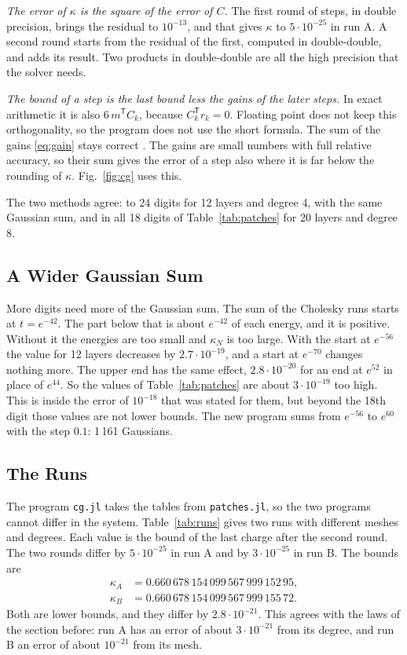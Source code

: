 \documentclass[journal]{IEEEtran}
\newcommand{\T}{\mathsf T}
\begin{document}
\emph{The error of $\kappa$ is the square of the error of $C$.} The first round of steps, in double precision, brings the residual to $10^{-13}$, and that gives $\kappa$ to $5\cdot10^{-25}$ in run A. A second round starts from the residual of the first, computed in double-double, and adds its result. Two products in double-double are all the high precision that the solver needs.

\emph{The bound of a step is the last bound less the gains of the later steps.} In exact arithmetic it is also $6\,m^{\T}C_k$, because $C_k^{\T} r_k = 0$. Floating point does not keep this orthogonality, so the program does not use the short formula. The sum of the gains \eqref{eq:gain} stays correct \cite{strakos}. The gains are small numbers with full relative accuracy, so their sum gives the error of a step also where it is far below the rounding of $\kappa$. Fig.~\ref{fig:cg} uses this.

The two methods agree: to 24 digits for 12 layers and degree 4, with the same Gaussian sum, and in all 18 digits of Table~\ref{tab:patches} for 20 layers and degree 8.

\subsection{A Wider Gaussian Sum}
More digits need more of the Gaussian sum. The sum of the Cholesky runs starts at $t = e^{-42}$. The part below that is about $e^{-42}$ of each energy, and it is positive. Without it the energies are too small and $\kappa_N$ is too large. With the start at $e^{-56}$ the value for 12 layers decreases by $2.7\cdot10^{-19}$, and a start at $e^{-70}$ changes nothing more. The upper end has the same effect, $2.8\cdot10^{-20}$ for an end at $e^{52}$ in place of $e^{44}$. So the values of Table~\ref{tab:patches} are about $3\cdot10^{-19}$ too high. This is inside the error of $10^{-18}$ that was stated for them, but beyond the 18th digit those values are not lower bounds. The new program sums from $e^{-56}$ to $e^{60}$ with the step $0.1$: 1\,161 Gaussians.

\subsection{The Runs}
The program \texttt{cg.jl} takes the tables from \texttt{patches.jl}, so the two programs cannot differ in the system. Table~\ref{tab:runs} gives two runs with different meshes and degrees. Each value is the bound of the last charge after the second round. The two rounds differ by $5\cdot10^{-25}$ in run A and by $3\cdot10^{-25}$ in run B. The bounds are
\begin{align}
\kappa_A &= 0.660\,678\,154\,099\,567\,999\,152\,95, \\
\kappa_B &= 0.660\,678\,154\,099\,567\,999\,155\,72 .
\end{align}
Both are lower bounds, and they differ by $2.8\cdot10^{-21}$. This agrees with the laws of the section before: run A has an error of about $3\cdot10^{-21}$ from its degree, and run B an error of about $10^{-21}$ from its mesh.
\end{document}
